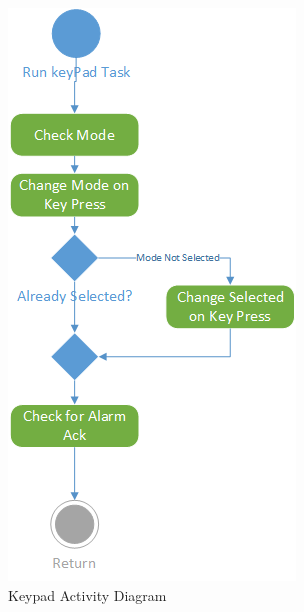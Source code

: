 \documentclass[12pt]{article} %
\begin{document}
    \begin{figure}[H]
      \centering
      \includegraphics[width=\textwidth]{../design/KeyPad_activity.png}
      \caption{Keypad Activity Diagram}
      \label{fig:keyPadActivity}
    \end{figure}
\end{document}
